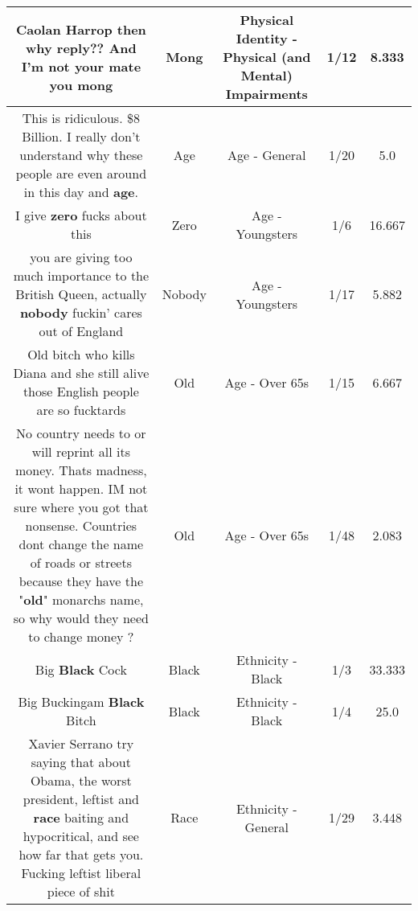 \documentclass[11pt]{article}
\newlength\mylength
\begin{document}
\begin{center}
\begin{longtable}{|C{.65\mylength}|C{.30\mylength}|C{.12\mylength}|C{.12\mylength}|C{.12\mylength}|}
  \small Caolan Harrop then why reply?? And I'm not your mate you mong\normalsize   & Mong & Physical Identity - Physical (and Mental) Impairments & 1/12 & 8.333 \\  \hline
  \small This is ridiculous. \$8 Billion. I really don't understand why these people are even around in this day and \textbf{age}.\normalsize   & Age & Age - General & 1/20 & 5.0 \\  \hline
  \small I give \textbf{zero} fucks about this\normalsize   & Zero & Age - Youngsters & 1/6 & 16.667 \\  \hline
  \small you are giving too much importance to the British Queen, actually \textbf{nobody} fuckin' cares out of England\normalsize   & Nobody & Age - Youngsters & 1/17 & 5.882 \\  \hline
  \small Old bitch who kills Diana and she still alive those English people are so fucktards\normalsize   & Old & Age - Over 65s & 1/15 & 6.667 \\  \hline
  \small No country needs to or will reprint all its money. Thats madness, it wont happen. IM not sure where you got that nonsense. Countries dont change the name of roads or streets because they have the "\textbf{old}" monarchs name, so why would they need to change money ?\normalsize   & Old & Age - Over 65s & 1/48 & 2.083 \\  \hline
  \small Big \textbf{Black} Cock\normalsize   & Black & Ethnicity - Black & 1/3 & 33.333 \\  \hline
  \small Big Buckingam \textbf{Black} Bitch\normalsize   & Black & Ethnicity - Black & 1/4 & 25.0 \\  \hline
  \small Xavier Serrano try saying that about Obama, the worst president, leftist and \textbf{race} baiting and hypocritical, and see how far that gets you. Fucking leftist liberal piece of shit\normalsize   & Race & Ethnicity - General & 1/29 & 3.448 \\  \hline

\end{longtable}
\end{center}
\end{document}
